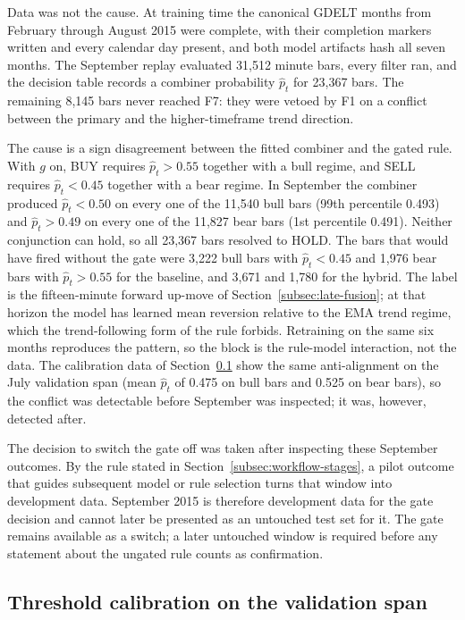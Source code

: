 Data was not the cause. At training time the canonical GDELT months from February through August 2015 were complete, with their completion markers written and every calendar day present, and both model artifacts hash all seven months. The September replay evaluated 31,512 minute bars, every filter ran, and the decision table records a combiner probability $\hat{p}_t$ for 23,367 bars. The remaining 8,145 bars never reached F7: they were vetoed by F1 on a conflict between the primary and the higher-timeframe trend direction.

The cause is a sign disagreement between the fitted combiner and the gated rule. With $g$ on, BUY requires $\hat{p}_t > 0.55$ together with a bull regime, and SELL requires $\hat{p}_t < 0.45$ together with a bear regime. In September the combiner produced $\hat{p}_t < 0.50$ on every one of the 11,540 bull bars (99th percentile 0.493) and $\hat{p}_t > 0.49$ on every one of the 11,827 bear bars (1st percentile 0.491). Neither conjunction can hold, so all 23,367 bars resolved to HOLD. The bars that would have fired without the gate were 3,222 bull bars with $\hat{p}_t < 0.45$ and 1,976 bear bars with $\hat{p}_t > 0.55$ for the baseline, and 3,671 and 1,780 for the hybrid. The label is the fifteen-minute forward up-move of Section~\ref{subsec:late-fusion}; at that horizon the model has learned mean reversion relative to the EMA trend regime, which the trend-following form of the rule forbids. Retraining on the same six months reproduces the pattern, so the block is the rule-model interaction, not the data. The calibration data of Section~\ref{subsec:threshold-calibration} show the same anti-alignment on the July validation span (mean $\hat{p}_t$ of 0.475 on bull bars and 0.525 on bear bars), so the conflict was detectable before September was inspected; it was, however, detected after.

The decision to switch the gate off was taken after inspecting these September outcomes. By the rule stated in Section~\ref{subsec:workflow-stages}, a pilot outcome that guides subsequent model or rule selection turns that window into development data. September 2015 is therefore development data for the gate decision and cannot later be presented as an untouched test set for it. The gate remains available as a switch; a later untouched window is required before any statement about the ungated rule counts as confirmation.

\subsection{Threshold calibration on the validation span} \label{subsec:threshold-calibration}

